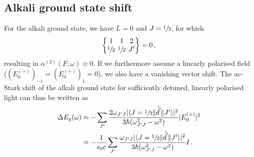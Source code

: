 \documentclass[../Thesis-IJspeert.tex]{subfiles}
\begin{document}
\subsection{Alkali ground state shift}
For the alkali ground state, we have $L=0$ and $J=\sfrac{1}{2}$, for which
\begin{align}
\tj{1}{1}{2}{\sfrac{1}{2}}{\sfrac{1}{2}}{J'}=0\,,
\end{align}
resulting in $\alpha^{(2)}(F ; \omega) \approx 0$. If we furthermore assume a linearly polarised field ($(E_0^{(+)})_{-1} = (E_0^{(+)})_{1}=0$), we also have a vanishing vector shift. The ac-Stark shift of the alkali ground state for sufficiently detuned, linearly polarised light can thus be written as
\begin{align}
\begin{split}
\Delta E_\text{g}\left(\omega\right) &\approx - \sum_{J'} \frac{2 \omega_{J' J}\lvert \langle J=\sfrac{1}{2} \| \hat{\vec{d}}\, \| J'\rangle\rvert ^2}{3 \hbar\left(\omega_{J' J}^2-\omega^2\right)} \lvert E_0^{(+)}\rvert ^2 \\&= -\frac{1}{\epsilon_0 c} \sum_{J'} \frac{\omega_{J' J}\lvert \langle J=\sfrac{1}{2} \| \hat{\vec{d}}\, \| J'\rangle\rvert ^2}{3 \hbar\left(\omega_{J' J}^2-\omega^2\right)} I \,.
\end{split}
\end{align}
\end{document}
